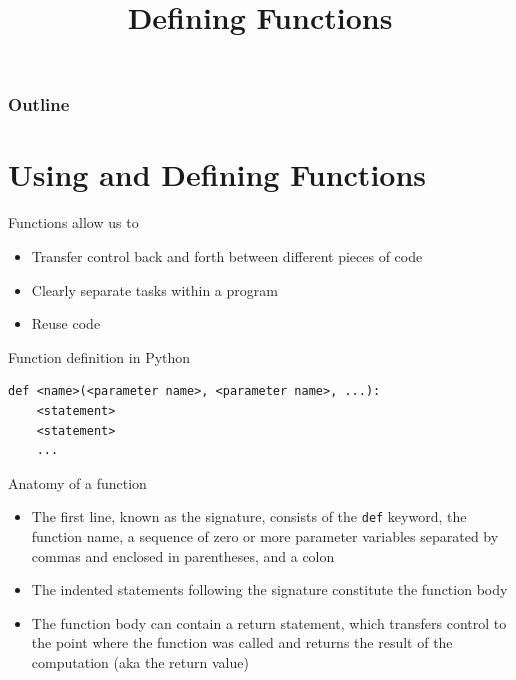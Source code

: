 \documentclass[8pt,a4paper,compress]{beamer}
\title{Defining Functions}
\date{}
\begin{document}
\begin{frame}
\vfill
\titlepage
\end{frame}

\begin{frame}
\frametitle{Outline}
\tableofcontents
\end{frame}

\section{Using and Defining Functions}
\begin{frame}[fragile]
\pause

Functions allow us to
\begin{itemize}
\item Transfer control back and forth between different pieces of code
\item Clearly separate tasks within a program
\item Reuse code
\end{itemize}

\pause
\bigskip

Function definition in Python
\begin{lstlisting}[language={}]
def <name>(<parameter name>, <parameter name>, ...):
    <statement>
    <statement>
    ...
\end{lstlisting}

\pause
\bigskip

Anatomy of a function
\begin{itemize}
\item The first line, known as the signature, consists of the \lstinline{def} keyword, the function name, a sequence of zero or more parameter variables separated by commas and enclosed in parentheses, and a colon

\item The indented statements following the signature constitute the function body

\item The function body can contain a return statement, which transfers control to the point where the function was called and returns the result of the computation (aka the return value)
\end{itemize}
\end{frame}
\end{document}
